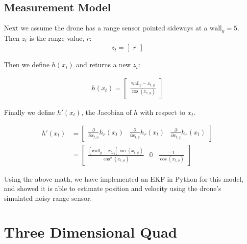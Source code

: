 \documentclass{article}
\begin{document}
\subsection{Measurement Model}

Next we assume the drone has a range sensor pointed sideways at a $\text{wall}_y=5$.  Then $z_t$ is the range value, $r$:
\begin{align}
  z_t = \left[\begin{array}{c} r \end{array}\right]
\end{align}

Then we define $h(x_t)$ and returns a new $z_t$:

\begin{align}
  h(x_t) = \left[\begin{array}{c} \frac{\text{wall}_y - x_{t,y}}{\cos(x_{t,\phi})} \end{array}   \right]
\end{align}


Finally we define $h'(x_t)$, the Jacobian of $h$ with respect to $x_t$.

\begin{align}
  h'(x_t) &= \left[\begin{array}{cccc}
      \frac{\partial}{\partial x_{t,\phi}} h_r(x_t)&
      \frac{\partial}{\partial x_{t,\dot{y}}} h_r(x_t)&
      \frac{\partial}{\partial x_{t,y}} h_r(x_t)
    \end{array}   \right]\\
  &= \left[\begin{array}{cccc}
      \frac{\left[\text{wall}_y - x_{t,y}\right]  \sin(x_{t,\phi})
        }
        {\cos^2(x_{t,\phi})}&
       0&
       \frac{-1}{\cos(x_{t,\phi})}
    \end{array}   \right]
\end{align}

Using the above math, we have implemented an EKF in Python for this
model, and showed it is able to estimate position and velocity using
the drone's simulated noisy range sensor.  

\section{Three Dimensional Quad}
\end{document}
